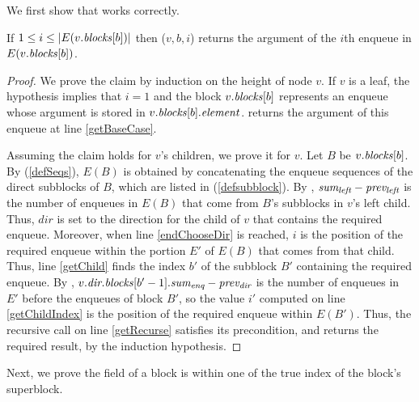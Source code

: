 We first show that  works correctly.

\begin{lemma}\label{lem::get}
If $1\leq i\leq |E(v.\mbox{\textit{blocks}}[b])|$ then ($v,b,i$) returns the argument of the $i$th enqueue in $E(v.\mbox{\textit{blocks}}[b])$.
\end{lemma}
\begin{proof}
We prove the claim by induction on the height of node $v$.
If $v$ is a leaf, the hypothesis implies that $i=1$ and the block $v.\mbox{\textit{blocks}}[b]$ represents 
an enqueue whose argument is stored in $v.\mbox{\textit{blocks}}[b].\mbox{\textit{element}}$.
 returns the argument of this enqueue at line \ref{getBaseCase}.

Assuming the claim holds for $v$'s children, we prove it for $v$.
Let $B$ be $v.\mbox{\textit{blocks}}[b]$.
By (\ref{defSeqs}),
$E(B)$ is obtained by concatenating the enqueue sequences of the direct subblocks
of $B$, which are listed in (\ref{defsubblock}).
By , $\mbox{\textnormal{\textit{sum\textsubscript{left}}}}-\mbox{\textnormal{\textit{prev\textsubscript{left}}}}$ is the number
of enqueues in $E(B)$ that come from $B$'s subblocks in $v$'s left child.
Thus, $dir$ is set to the direction for the child of $v$ that contains the required enqueue.
Moreover, when line \ref{endChooseDir} is reached, $i$ is the position of the required enqueue within the portion $E'$ of $E(B)$ that comes from that child.
Thus,  line \ref{getChild} finds the index $b'$ of the subblock $B'$ containing the required enqueue.
By , $v.\mbox{\textnormal{\textit{dir.blocks}}}[b'-1].\mbox{\textnormal{\textit{sum\textsubscript{enq}}}} - \mbox{\textnormal{\textit{prev\textsubscript{dir}}}}$ is the number of 
enqueues in $E'$ before the enqueues of block $B'$, so
the value $i'$ computed on line \ref{getChildIndex} is the position of the required enqueue within $E(B')$.
Thus, the recursive call on line \ref{getRecurse} satisfies its precondition, and 
returns the required result, by the induction hypothesis.
\end{proof}

Next, we prove the  field of a block is within one of the true index of the block's superblock.

